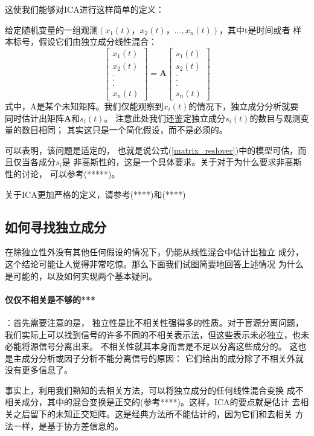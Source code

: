 这使我们能够对ICA进行这样简单的定义：

给定随机变量的一组观测$(x_1(t)，x_2(t)，...,x_n(t))$，其中t是时间或者
样本标号，假设它们由独立成分线性混合：
\begin{equation} \label{matrix_reslover}
\left[ \begin{array}{c} 
x_1(t) \\
x_2(t) \\
. \\
. \\
. \\
x_n(t)
\end{array} \right]
=\bm{A}
\left[ \begin{array}{c} 
s_1(t) \\
s_2(t) \\
. \\
. \\
. \\
s_n(t)
\end{array} \right]
\end{equation}
式中，A是某个未知矩阵。我们仅能观察到$x_i(t)$的情况下，独立成分分析就要
同时估计出矩阵$\bm{A}$和$s_i(t)$。
注意此处我们还鉴定独立成分$s_i(t)$的数目与观测变量的数目相同；
其实这只是一个简化假设，而不是必须的。

可以表明，该问题是适定的，
也就是说公式(\ref{matrix_reslover})中的模型可估，而且仅当各成分$s_i$是
非高斯性的，这是一个具体要求。关于对于为什么要求非高斯性的讨论，
可以参考(*****)。
    
关于ICA更加严格的定义，请参考(****)和(****)

\subsection{如何寻找独立成分}
在除独立性外没有其他任何假设的情况下，仍能从线性混合中估计出独立
成分，这个结论可能让人觉得非常吃惊。那么下面我们试图简要地回答上述情况
为什么是可能的，以及如何实现两个基本疑问。
\paragraph*{仅仅不相关是不够的***}：首先需要注意的是，
独立性是比不相关性强得多的性质。对于盲源分离问题，我们实际上可以找到信号的许多不同的不相关表示法，但这些表示未必独立，也未必能将源信号分离出来。
不相关性就其本身而言是不足以分离这些成分的。
这也是主成分分析或因子分析不能分离信号的原因：
它们给出的成分除了不相关外就没有更多信息了。
    
事实上，利用我们熟知的去相关方法，可以将独立成分的任何线性混合变换
成不相关成分，其中的混合变换是正交的(参考****)。这样，ICA的要点就是估计
去相关之后留下的未知正交矩阵。这是经典方法所不能估计的，因为它们和去相关
方法一样，是基于协方差信息的。
    
